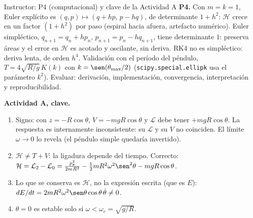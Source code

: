 \documentclass[spanish]{beamer}
\newcommand{\Lag}{\mathcal{L}}               %
\newcommand{\Ham}{\mathcal{H}}               %
\begin{document}
\begin{frame}{Instructor: P4 (computacional) y clave de la Actividad A}
\scriptsize
\textbf{P4.} Con $m=k=1$, Euler explícito es $(q,p)\mapsto(q+hp,\,p-hq)$, de determinante $1+h^2$:
$\Ham$ crece en un factor $(1+h^2)$ por paso (espiral hacia afuera, artefacto numérico).
Euler simpléctico, $q_{n+1}=q_n+hp_n$, $p_{n+1}=p_n-hq_{n+1}$, tiene determinante $1$:
preserva áreas y el error en $\Ham$ es acotado y oscilante, sin deriva. RK4 no es
simpléctico: deriva lenta, de orden $h^4$. Validación con el período del péndulo,
$T=4\sqrt{R/g}\,K(k)$ con $k=\sen(\theta_{\max}/2)$
(\texttt{scipy.special.ellipk} usa el parámetro $k^2$).
Evaluar: derivación, implementación, convergencia, interpretación y reproducibilidad.

\medskip
\textbf{Actividad A, clave.}
\begin{enumerate}
  \item Signo: con $z=-R\cos\theta$, $V=-mgR\cos\theta$ y $\Lag$ debe tener $+mgR\cos\theta$.
        La respuesta es internamente inconsistente: su $\Lag$ y su $V$ no coinciden.
        El límite $\omega\to0$ lo revela (el péndulo simple quedaría invertido).
  \item $\Ham\neq T+V$: la ligadura depende del tiempo. Correcto:
        $\Ham=\Lag_2-\Lag_0=\frac{p_\theta^2}{2mR^2}-\tfrac12 mR^2\omega^2\sen^2\theta-mgR\cos\theta$.
  \item Lo que se conserva es $\Ham$, no la expresión escrita (que es $E$):
        $dE/dt=2mR^2\omega^2\sen\theta\cos\theta\,\dot\theta\neq0$.
  \item $\theta=0$ es estable solo si $\omega<\omega_c=\sqrt{g/R}$.
\end{enumerate}
\end{frame}
\fi
\end{document}
